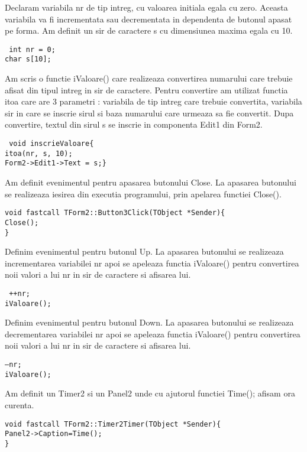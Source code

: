 \documentclass[11pt]{article}
\begin{document}
 Declaram variabila nr de tip intreg, cu valoarea initiala egala cu zero. Aceasta variabila va fi incrementata sau decrementata in dependenta de butonul apasat pe forma. Am definit un sir de caractere s cu dimensiunea maxima egala cu 10.
 \begin{center}
 \texttt{ int nr = 0;\\char s[10];}
 \end{center}
 Am scris o functie  iValoare() care realizeaza convertirea numarului care trebuie afisat din tipul intreg in sir de caractere. Pentru convertire am utilizat functia itoa care are 3 parametri : variabila de tip intreg care trebuie convertita, variabila sir in care se inscrie sirul si baza numarului care urmeaza sa fie convertit. Dupa convertire, textul din sirul s se inscrie in componenta Edit1 din Form2.\\
 
\begin{center}
\texttt{ void inscrieValoare\{ \\
  itoa(nr, s, 10);\\
  Form2->Edit1->Text = s;\}\\}
\end{center}
Am definit evenimentul pentru apasarea butonului Close. La apasarea butonului se realizeaza iesirea din executia programului, prin apelarea functiei Close().\\

\begin{center}
\texttt{void fastcall TForm2::Button3Click(TObject *Sender)\{\\ Close();\\
\}\\}
\end{center}

Definim evenimentul pentru butonul Up. La apasarea butonului se realizeaza incrementarea variabilei nr apoi se apeleaza functia iValoare() pentru convertirea noii valori a lui nr in sir de caractere si afisarea lui.
\begin{center}
\texttt{ ++nr;\\ iValoare();\\}
\end{center}

Definim evenimentul pentru butonul Down. La apasarea butonului se realizeaza decrementarea variabilei nr apoi se apeleaza functia iValoare() pentru convertirea noii valori a lui nr in sir de caractere si afisarea lui.\\
   \begin{center}
   \texttt{--nr;\\ iValoare();\\}
   \end{center}
   Am definit un Timer2 si un Panel2 unde cu ajutorul functiei Time();   afisam ora curenta.
   \begin{center}
   \texttt{void fastcall TForm2::Timer2Timer(TObject *Sender)\{ \\
     Panel2->Caption=Time(); \\ \}
     \\}
   \end{center}
   
\end{document}
